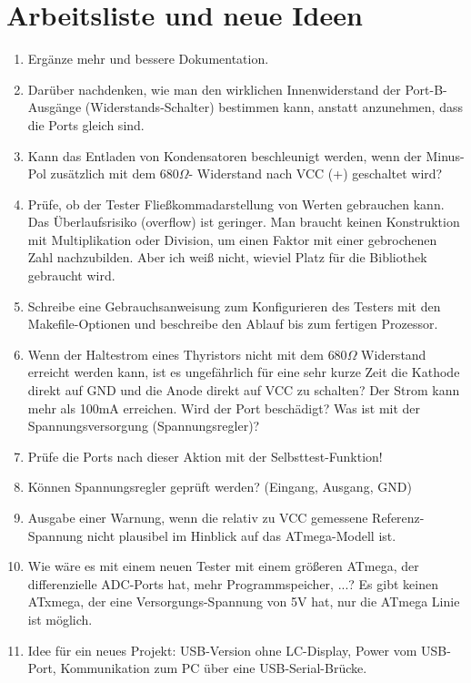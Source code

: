 
\chapter{Arbeitsliste und neue Ideen}
\label{sec:todo}

\begin{enumerate}
\item Ergänze mehr und bessere Dokumentation.
\item Darüber nachdenken, wie man den wirklichen Innenwiderstand der Port-B-Aus\-gän\-ge (Wider\-stands-Schal\-ter) bestimmen kann,
anstatt anzunehmen, dass die Ports gleich sind.
\item Kann das Entladen von Kondensatoren beschleunigt werden, wenn der Minus-Pol zusätzlich mit dem \(680\Omega\)-
Widerstand nach VCC (+) geschaltet wird?
\item Prüfe, ob der Tester Fließkommadarstellung von Werten gebrauchen kann.
Das Überlaufsrisiko (overflow) ist geringer.
Man braucht keinen Konstruktion mit Multiplikation oder Division, um einen Faktor mit einer gebrochenen Zahl nachzubilden.
Aber ich weiß nicht, wieviel Platz für die Bibliothek gebraucht wird.
\item Schreibe eine Gebrauchsanweisung zum Konfigurieren des Testers mit den Makefile-Optionen und beschreibe
den Ablauf bis zum fertigen Prozessor.
\item Wenn der Haltestrom eines Thyristors nicht mit dem \(680\Omega\) Widerstand erreicht werden kann, 
ist es ungefährlich für eine sehr kurze Zeit die Kathode direkt auf GND und die Anode direkt auf VCC zu schalten?
Der Strom kann mehr als 100mA erreichen. Wird der Port beschädigt? Was ist mit der Spannungsversorgung (Spannungsregler)?
\item Prüfe die Ports nach dieser Aktion mit der Selbsttest-Funktion!
\item Können Spannungsregler geprüft werden? (Eingang, Ausgang, GND)
\item Ausgabe einer Warnung, wenn die relativ zu VCC gemessene Referenz-Spannung nicht plausibel im Hinblick auf das ATmega-Modell ist.
\item Wie wäre es mit einem neuen Tester mit einem größeren ATmega, der differenzielle ADC-Ports hat,
mehr Programmspeicher, ...?
Es gibt keinen ATxmega, der eine Versorgungs-Spannung von 5V hat, nur die ATmega Linie ist möglich.
\item Idee für ein neues Projekt: USB-Version ohne LC-Display, Power vom USB-Port, Kommunikation zum PC über eine USB-Serial-Brücke.
\end{enumerate}
